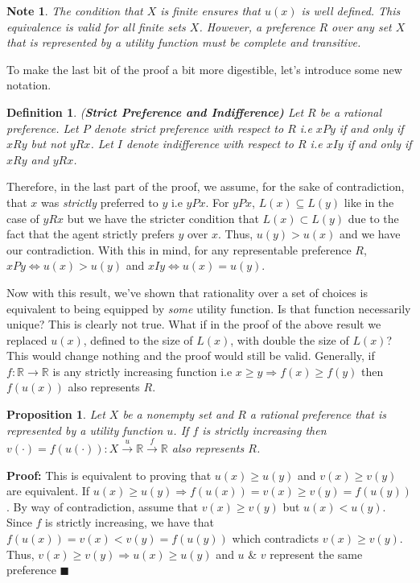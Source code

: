 \documentclass[12pt]{article}
\newtheorem{prop}{Proposition}
\newtheorem{defin}{Definition}
\newtheorem*{note}{Note}
\newcommand{\tn}[1]{\textnormal{#1}}
\newcommand{\name}[1]{\tn{(\textbf{#1)}}}
\newcommand{\RR}{\mathbb{R}}
\newcommand{\RIGHT}{\Longrightarrow}
\newcommand{\IFF}{\Longleftrightarrow}
\newcommand{\QED}{\blacksquare}
\newcommand{\Proof}{\textbf{Proof:} \hspace*{0.25mm}}
\newcommand{\3}{\vspace*{3mm}}
\begin{document}
\begin{note}
\tn{The condition that $X$ is finite ensures that $u(x)$ is well defined. This equivalence is valid for all finite sets $X$. However, a preference $R$ over \emph{any} set $X$ that is represented by a utility function must be complete and transitive. }

\end{note}

To make the last bit of the proof a bit more digestible, let's introduce some new notation.

\begin{defin} \name{Strict Preference and Indifference} \tn{Let $R$ be a rational preference. Let $P$ denote \emph{strict} preference with respect to $R$ i.e $x P y$ if and only if $x R y$ but not $y R x$. Let $I$ denote \emph{indifference} with respect to $R$ i.e $x I y$ if and only if $x R y$ and $y R x$.
}
\end{defin}

Therefore, in the last part of the proof, we assume, for the sake of contradiction, that $x$ was \emph{strictly} preferred to $y$ i.e $y P x$. For $y P x$, $L(x) \subseteq L(y)$ like in the case of $y R x$ but we have the stricter condition that $L(x) \subset L(y)$ due to the fact that the agent strictly prefers $y$ over $x$. Thus, $u(y) > u(x)$ and we have our contradiction. With this in mind, for any representable preference $R$, $x P y \IFF u(x) > u(y)$ and $x I y \IFF u(x) = u(y)$. 


Now with this result, we've shown that rationality over a set of choices is equivalent to being equipped by \emph{some} utility function. Is that function necessarily unique? This is clearly not true. What if in the proof of the above result we replaced $u(x)$, defined to the size of $L(x)$, with double the size of $L(x)$? This would change nothing and the proof would still be valid. Generally, if $f: \RR \to \RR$ is any strictly increasing function i.e $x \geq y \RIGHT f(x) \geq f(y)$ then $f(u(x))$ also represents $R$. 

\begin{prop}
\tn{Let $X$ be a nonempty set and $R$ a rational preference that is represented by a utility function $u$. If $f$ is strictly increasing then $v(\cdot) = f(u(\cdot)):X \overset{u}{\to} \RR \overset{f}{\to} \RR$ also represents $R$.}
\end{prop}
\Proof This is equivalent to proving that $u(x) \geq u(y)$ and $v(x) \geq v(y)$ are equivalent. If $u(x) \geq u(y) \RIGHT f(u(x)) = v(x) \geq v(y) = f(u(y)) $. By way of contradiction, assume that $v(x) \geq v(y)$ but $u(x) < u(y)$. Since $f$ is strictly increasing, we have that $f(u(x)) = v(x) < v(y) = f(u(y))$ which contradicts $v(x) \geq v(y)$. Thus, $v(x) \geq v(y) \RIGHT u(x) \geq u(y)$ and $u$ \& $v$ represent the same preference $\QED$
\end{document}
